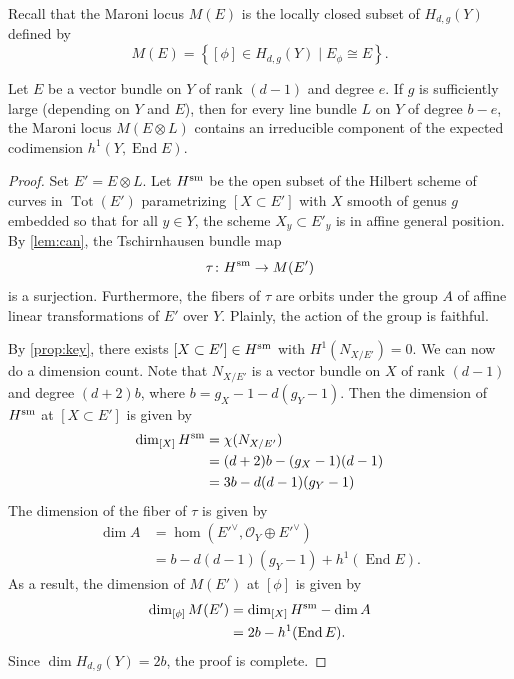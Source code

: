 \documentclass[11 pt]{amsart}
\DeclareMathOperator{\Tot}{Tot}
\renewcommand{\O}{{\mathcal O}}
\providecommand {\from}{{\colon}}
\providecommand{\End}{\operatorname{End}}
\numberwithin{equation}{section}
\begin{document}
Recall that the Maroni locus $M(E)$ is the locally closed subset of $H_{d,g}(Y)$ defined by
\[ M(E) = \left\{[\phi] \in H_{d,g}(Y) \mid E_\phi \cong E\right\}.\]
\begin{theorem}
  \label{thm:maroni}
  Let $E$ be a vector bundle on $Y$ of rank $(d-1)$ and degree $e$.
  If $g$ is sufficiently large (depending on $Y$ and $E$),  then for every line bundle $L$ on $Y$ of degree $b-e$, the Maroni locus $M(E \otimes L)$ contains an irreducible component of the expected codimension $h^1(Y, \End E)$.
\end{theorem}
\begin{proof}
  Set $E' = E \otimes L$.
  Let $H^{\rm sm}$ be the open subset of the Hilbert scheme of curves in $\Tot(E')$ parametrizing $[X \subset E']$ with $X$ smooth of genus $g$ embedded so that for all $y \in Y$, the scheme $X_y \subset E'_y$ is in affine general position.
  By \autoref{lem:can}, the Tschirnhausen bundle map 
  \[ \tau \from H^{\rm sm} \to M(E')\]
  is a surjection. 
  Furthermore, the fibers of $\tau$ are orbits under the group $A$ of affine linear transformations of $E'$ over $Y$.
  Plainly, the action of the group is faithful.
  
  By \autoref{prop:key}, there exists $[X \subset E'] \in H^{\rm sm}$ with $H^1(N_{X/E'}) = 0$.
  We can now do a dimension count.
  Note that $N_{X/E'}$ is a vector bundle on $X$ of rank $(d-1)$ and degree $(d+2)b$, where $b = g_X-1 - d(g_Y-1)$.
  Then the dimension of $H^{\rm sm}$ at $[X \subset E']$ is given by
  \begin{align*}
    \dim_{[X]}H^{\rm sm} &= \chi(N_{X/E'}) \\
                &= (d+2)b - (g_X-1)(d-1) \\
                &= 3b - d(d-1)(g_Y-1)
  \end{align*}
  The dimension of the fiber of $\tau$ is given by
  \begin{align*}
    \dim A &= \hom(E'^\vee, \O_Y \oplus E'^\vee) \\
           &= b - d(d-1)(g_Y-1) + h^1(\End E).
  \end{align*}
  As a result, the dimension of $M(E')$ at $[\phi]$ is given by
  \begin{align*}
    \dim_{[\phi]} M(E') &= \dim_{[X]}H^{\rm sm} - \dim A \\
                        &= 2b - h^1(\End E).
  \end{align*}
  Since $\dim H_{d,g}(Y) = 2b$, the proof is complete.
\end{proof}
\end{document}
